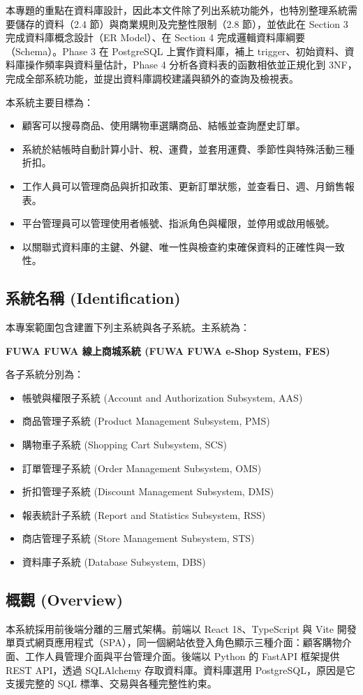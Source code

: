\documentclass[12pt,a4paper]{article}
\begin{document}
本專題的重點在資料庫設計，因此本文件除了列出系統功能外，也特別整理系統需要儲存的資料（2.4 節）與商業規則及完整性限制（2.8 節），並依此在 Section 3 完成資料庫概念設計（ER Model）、在 Section 4 完成邏輯資料庫綱要（Schema）。Phase 3 在 PostgreSQL 上實作資料庫，補上 trigger、初始資料、資料庫操作頻率與資料量估計，Phase 4 分析各資料表的函數相依並正規化到 3NF，完成全部系統功能，並提出資料庫調校建議與額外的查詢及檢視表。

本系統主要目標為：
\begin{itemize}
  \item 顧客可以搜尋商品、使用購物車選購商品、結帳並查詢歷史訂單。
  \item 系統於結帳時自動計算小計、稅、運費，並套用運費、季節性與特殊活動三種折扣。
  \item 工作人員可以管理商品與折扣政策、更新訂單狀態，並查看日、週、月銷售報表。
  \item 平台管理員可以管理使用者帳號、指派角色與權限，並停用或啟用帳號。
  \item 以關聯式資料庫的主鍵、外鍵、唯一性與檢查約束確保資料的正確性與一致性。
\end{itemize}

\subsection{系統名稱 (Identification)}
本專案範圍包含建置下列主系統與各子系統。主系統為：

\textbf{FUWA FUWA 線上商城系統 (FUWA FUWA e-Shop System, FES)}

各子系統分別為：
\begin{itemize}
  \item 帳號與權限子系統 (Account and Authorization Subsystem, AAS)
  \item 商品管理子系統 (Product Management Subsystem, PMS)
  \item 購物車子系統 (Shopping Cart Subsystem, SCS)
  \item 訂單管理子系統 (Order Management Subsystem, OMS)
  \item 折扣管理子系統 (Discount Management Subsystem, DMS)
  \item 報表統計子系統 (Report and Statistics Subsystem, RSS)
  \item 商店管理子系統 (Store Management Subsystem, STS)
  \item 資料庫子系統 (Database Subsystem, DBS)
\end{itemize}

\subsection{概觀 (Overview)}
本系統採用前後端分離的三層式架構。前端以 React 18、TypeScript 與 Vite 開發單頁式網頁應用程式（SPA），同一個網站依登入角色顯示三種介面：顧客購物介面、工作人員管理介面與平台管理介面。後端以 Python 的 FastAPI 框架提供 REST API，透過 SQLAlchemy 存取資料庫。資料庫選用 PostgreSQL，原因是它支援完整的 SQL 標準、交易與各種完整性約束。
\end{document}
